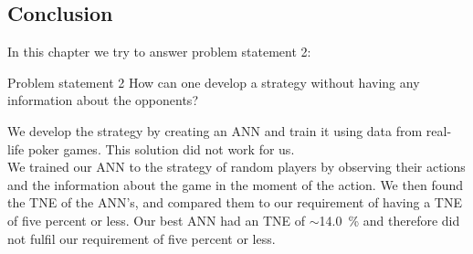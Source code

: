 \subsection{Conclusion}
In this chapter we try to answer problem statement 2:

\vspace{4mm}
\begin{statementBox2}{Problem statement 2}
How can one develop a strategy without having any information about the opponents?
\end{statementBox2}
\vspace{4mm}

We develop the strategy by creating an ANN and train it using data from real-life poker games. This solution did not work for us.\\

We trained our ANN to the strategy of random players by observing their actions and the information about the game in the moment of the action. We then found the TNE of the ANN's, and compared them to our requirement of having a TNE of five percent or less. Our best ANN had an TNE of $\sim$14.0~\% and therefore did not fulfil our requirement of five percent or less. 
